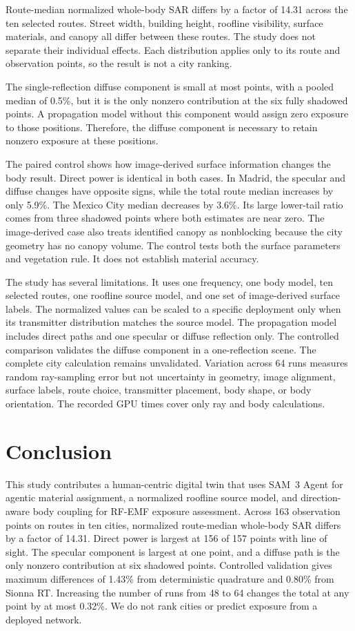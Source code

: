 \documentclass{IEEEoj}
\begin{document}
Route-median normalized whole-body SAR differs by a factor of 14.31 across the
ten selected routes. Street width, building height, roofline visibility,
surface materials, and canopy all differ between these routes. The study does
not separate their individual effects. Each distribution applies only to its
route and observation points, so the result is not a city ranking.

The single-reflection diffuse component is small at most points, with a pooled
median of 0.5\%, but it is the only nonzero contribution at the six fully
shadowed points. A propagation model without this component would assign zero
exposure to those positions. Therefore, the diffuse component is necessary to
retain nonzero exposure at these positions.

The paired control shows how image-derived surface information changes the body
result. Direct power is identical in both cases. In Madrid, the specular and
diffuse changes have opposite signs, while the total route median increases by
only 5.9\%. The Mexico City median decreases by 3.6\%. Its large lower-tail
ratio comes from three shadowed points where both estimates are near zero. The
image-derived case also treats identified canopy as
nonblocking because the city geometry has no canopy volume. The control tests
both the surface parameters and vegetation rule. It does not establish material
accuracy.

The study has several limitations. It uses one frequency, one body model, ten
selected routes, one roofline source model, and one set of image-derived surface
labels. The normalized values can be scaled to a specific deployment only when
its transmitter distribution matches the source model. The propagation model
includes direct paths and one specular or diffuse reflection only. The
controlled comparison validates the diffuse component in a one-reflection
scene. The complete city calculation remains unvalidated. Variation across 64 runs measures
random ray-sampling error but not uncertainty in geometry, image alignment,
surface labels, route choice, transmitter placement, body shape, or body
orientation. The recorded GPU times cover only ray and body calculations.

\section{Conclusion}\label{sec:conclusion}

This study contributes a human-centric digital twin that uses SAM~3 Agent for
agentic material assignment, a normalized roofline source model, and
direction-aware body coupling for RF-EMF exposure assessment.
Across 163 observation points on routes in ten cities, normalized route-median
whole-body SAR differs by a factor of 14.31. Direct power is largest at 156 of
157 points with line of sight. The specular component is largest at one point, and a
diffuse path is the only nonzero contribution at six shadowed points. Controlled
validation gives maximum differences of 1.43\% from deterministic quadrature
and 0.80\% from Sionna RT. Increasing the number of runs from 48 to 64 changes
the total at any point by at most 0.32\%. We do not rank cities or predict
exposure from a deployed network.
\end{document}
